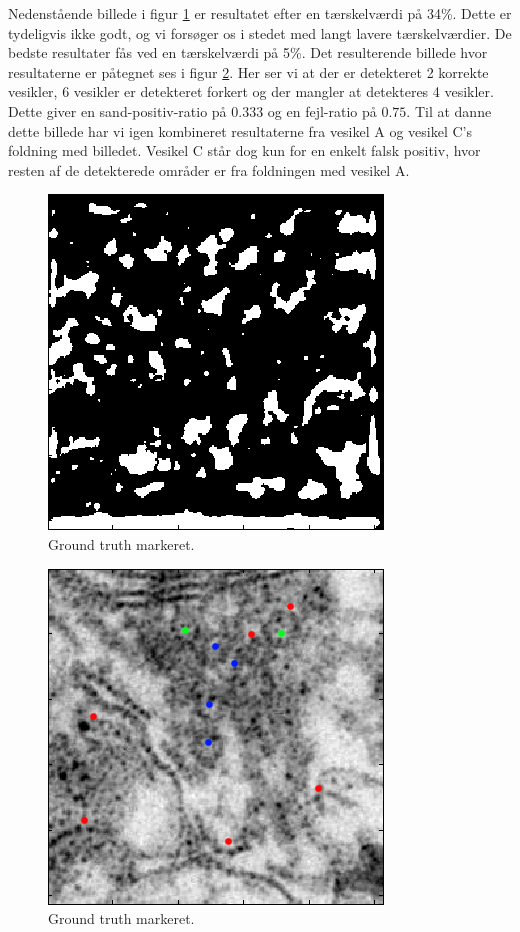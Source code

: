 Nedenstående billede i figur \ref{fig:postmethod_conv_post_img2_th34} er resultatet efter en tærskelværdi på 34\%. Dette er tydeligvis ikke godt, og vi forsøger os i stedet med langt lavere tærskelværdier. De bedste resultater fås ved en tærskelværdi på 5\%. Det resulterende billede hvor resultaterne er påtegnet ses i figur \ref{fig:postmethod_conv_post_img2_th5}. Her ser vi at der er detekteret 2 korrekte vesikler, 6 vesikler er detekteret forkert og der mangler at detekteres 4 vesikler. Dette giver en sand-positiv-ratio på $0.333$ og en fejl-ratio på $0.75$. Til at danne dette billede har vi igen kombineret resultaterne fra vesikel A og vesikel C's foldning med billedet. Vesikel C står dog kun for en enkelt falsk positiv, hvor resten af de detekterede områder er fra foldningen med vesikel A.

\begin{figure}[H]
		\centering		\includegraphics[scale=0.65]{files/postmethod/img/ves1+2_img2_th-34.png}
	\caption{Ground truth markeret.\label{fig:postmethod_conv_post_img2_th34}}
\end{figure}

\begin{figure}[H]
		\centering
	\includegraphics[scale=0.65]{files/postmethod/img/ves1+2_img2_th-5.png}
	\caption{Ground truth markeret.\label{fig:postmethod_conv_post_img2_th5}}
\end{figure}

